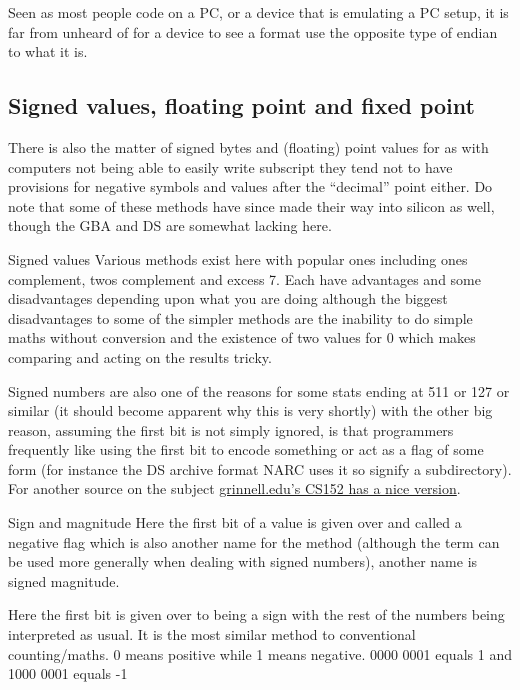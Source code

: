 \documentclass[
]{book}
\begin{document}
Seen as most people code on a PC, or a device that is emulating a PC setup, it is far from unheard of for a device to see a format use the opposite type of endian to what it is.

\hypertarget{signed-values-floating-point-and-fixed-point}{%
\subsection{Signed values, floating point and fixed point}\label{signed-values-floating-point-and-fixed-point}}

There is also the matter of signed bytes and (floating) point values for as with computers not being able to easily write subscript they tend not to have provisions for negative symbols and values after the ``decimal'' point either. Do note that some of these methods have since made their way into silicon as well, though the GBA and DS are somewhat lacking here.

Signed values Various methods exist here with popular ones including ones complement, twos complement and excess 7. Each have advantages and some disadvantages depending upon what you are doing although the biggest disadvantages to some of the simpler methods are the inability to do simple maths without conversion and the existence of two values for 0 which makes comparing and acting on the results tricky.

Signed numbers are also one of the reasons for some stats ending at 511 or 127 or similar (it should become apparent why this is very shortly) with the other big reason, assuming the first bit is not simply ignored, is that programmers frequently like using the first bit to encode something or act as a flag of some form (for instance the DS archive format NARC uses it so signify a subdirectory). For another source on the subject \href{http://www.cs.grinnell.edu/~rebelsky/Courses/CS152/97F/Readings/student-binary.html}{grinnell.edu's CS152 has a nice version}.

Sign and magnitude Here the first bit of a value is given over and called a negative flag which is also another name for the method (although the term can be used more generally when dealing with signed numbers), another name is signed magnitude.

Here the first bit is given over to being a sign with the rest of the numbers being interpreted as usual. It is the most similar method to conventional counting/maths. 0 means positive while 1 means negative. 0000 0001 equals 1 and 1000 0001 equals -1
\end{document}

